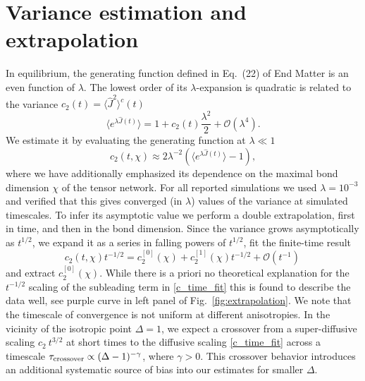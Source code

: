 \documentclass[
twocolumn,
amsfonts,
showpacs,
superscriptaddress,
amsmath,
amssymb,
aps,
longbibliography,
prl,
noeprint
]{revtex4-2}
\newcommand{\1}{{\bf 1}}
\begin{document}
\section{Variance estimation and extrapolation}
In equilibrium, the generating function defined in Eq.~(22) of End Matter is an even function of $\lambda$. The lowest order of its $\lambda$-expansion is quadratic is related to the variance $c_2(t) = \langle\hat{J}^2\rangle^c(t)$
\begin{equation}
    \langle e^{\lambda \hat{J}(t)} \rangle =  1 + c_2(t)\frac{\lambda^2}{2} + \mathcal{O}(\lambda^4).
\end{equation}
We estimate it by evaluating the generating function at $\lambda \ll 1$
\begin{equation}
c_2(t, \chi) \approx 2\lambda^{-2}(\langle e^{\lambda \hat{J}(t)}\rangle - 1),
\end{equation}
where we have additionally emphasized its dependence on the maximal bond dimension $\chi$ of the tensor network.
For all reported simulations we used $\lambda = 10^{-3}$ and verified that this gives converged (in $\lambda$) values of the variance at simulated timescales. To infer its asymptotic value we perform a double extrapolation, first in time, and then in the bond dimension. Since the variance grows asymptotically as $t^{1/2}$, we expand it as a series in falling powers of $t^{1/2}$, fit the finite-time result
\begin{equation}
    c_2(t, \chi) t^{-1/2} = c_2^{[0]}(\chi) +  c_2^{[1]}(\chi)t^{-1/2} + \mathcal{O}(t^{-1})\, \label{c_time_fit}
\end{equation}
and extract $c_2^{[0]}(\chi)$. While there is a priori no theoretical explanation for the $t^{-1/2}$ scaling of the subleading term in \eqref{c_time_fit} this is found to describe the data well, see purple curve in left panel of Fig.~\ref{fig:extrapolation}. We note that the timescale of convergence is not uniform at different anisotropies. In the vicinity of the isotropic point $\Delta = 1$, we expect a crossover from a super-diffusive scaling $c_2 ~ t^{3/2}$ at short times to the diffusive scaling \eqref{c_time_fit} across a timescale $\tau_{\rm crossover} \propto (\Delta - 1)^{-\gamma}$, where $\gamma > 0$. This crossover behavior introduces an additional systematic source of bias into our estimates for smaller $\Delta$.
\end{document}
